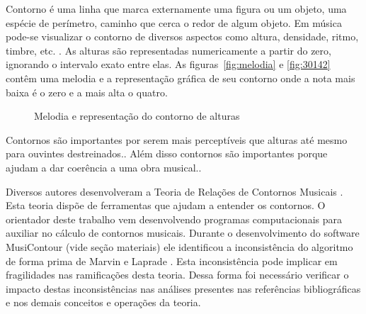 \documentclass[11pt]{article}
\begin{document}
Contorno é uma linha que marca externamente uma figura ou um objeto,
uma espécie de perímetro, caminho que cerca o redor de
algum objeto. Em música pode-se visualizar o contorno de
diversos aspectos como altura, densidade, ritmo, timbre, etc.
\cite[p. 01]{Sampaio2008}. As alturas são representadas numericamente
a partir do zero, ignorando o intervalo exato entre elas. As
figuras~\ref{fig:melodia} e \ref{fig:30142} contêm uma melodia e a
representação gráfica de seu contorno onde a nota mais baixa é o zero
e a mais alta o quatro.

\begin{figure}[h]
  \centering
  \caption{Melodia e representação do contorno de alturas}
  \label{fig:melodia-representacao}
\end{figure}

Contornos são importantes por serem mais perceptíveis que alturas até
mesmo para ouvintes destreinados.\cite[p. 225]{Marvin1987}.
Além disso contornos são importantes porque ajudam
a dar coerência a uma obra musical.\cite[p. 225]{Clifford1995}.

Diversos autores desenvolveram a Teoria de Relações de Contornos
Musicais \cite{Friedmann1985, Friedmann1987, Morris1987, Marvin1987,
  Marvin1988, Polansky1992, Morris1993, Clifford1995, Quinn1997,
  Beard2003, Sampaio2008, Schultz2008, Schultz2009, Bor2009}. Esta
teoria dispõe de ferramentas que ajudam a entender os contornos. O
orientador deste trabalho vem desenvolvendo programas computacionais
para auxiliar no cálculo de contornos musicais. Durante o
desenvolvimento do software MusiContour (vide seção materiais) ele
identificou a inconsistência do algoritmo de forma prima de Marvin e
Laprade \cite{Marvin1987}.  Esta inconsistência pode implicar em
fragilidades nas ramificações desta teoria.  Dessa forma foi
necessário verificar o impacto destas inconsistências nas análises
presentes nas referências bibliográficas e nos demais conceitos e
operações da teoria.
\end{document}
